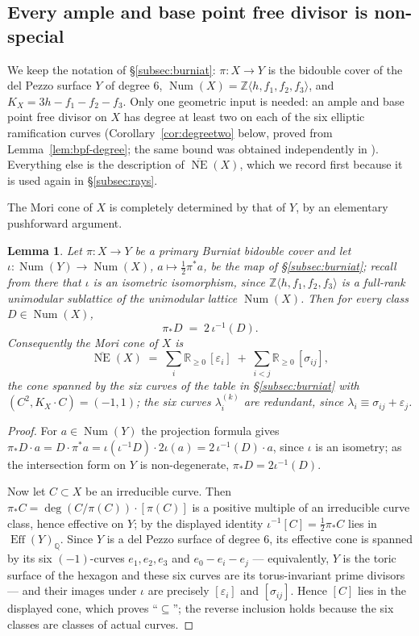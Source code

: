 \documentclass{amsart}
\newtheorem{lemma}[theorem]{Lemma}
\theoremstyle{definition}
\newcommand{\ZZ}{\mathbb{Z}}
\newcommand{\Num}{\operatorname{Num}}
\newcommand{\QQ}{\mathbb{Q}}
\newcommand{\RR}{\mathbb{R}}
\newcommand{\NE}{\overline{\operatorname{NE}}}
\newcommand{\Eff}{\operatorname{Eff}}
\begin{document}
\subsection{Every ample and base point free divisor is non-special}\label{subsec:nonspecial}
We keep the notation of \S\ref{subsec:burniat}: $\pi:X\to Y$ is the bidouble cover of the del Pezzo surface $Y$ of degree $6$, $\Num(X)=\ZZ\langle h,f_1,f_2,f_3\rangle$, and $K_X=3h-f_1-f_2-f_3$. Only one geometric input is needed: an ample and base point free divisor on $X$ has degree at least two on each of the six elliptic ramification curves (Corollary~\ref{cor:degreetwo} below, proved from Lemma~\ref{lem:bpf-degree}; the same bound was obtained independently in \cite[Prop.~5.4]{Cho26}). Everything else is the description of $\NE(X)$, which we record first because it is used again in \S\ref{subsec:rays}.

The Mori cone of $X$ is completely determined by that of $Y$, by an elementary pushforward argument.

\begin{lemma}\label{lem:mori}
Let $\pi:X\to Y$ be a primary Burniat bidouble cover and let $\iota:\Num(Y)\to\Num(X)$, $a\mapsto\tfrac12\pi^*a$, be the map of \S\ref{subsec:burniat}; recall from there that $\iota$ is an isometric \emph{isomorphism}, since $\ZZ\langle h,f_1,f_2,f_3\rangle$ is a full-rank unimodular sublattice of the unimodular lattice $\Num(X)$. Then for every class $D\in\Num(X)$,
\[
\pi_*D\;=\;2\,\iota^{-1}(D).
\]
Consequently the Mori cone of $X$ is
\[
\NE(X)\;=\;\sum_{i}\RR_{\ge0}\,[\varepsilon_i]\;+\;\sum_{i<j}\RR_{\ge0}\,[\sigma_{ij}] ,
\]
the cone spanned by the six curves of the table in \S\ref{subsec:burniat} with $(C^2,K_X\cdot C)=(-1,1)$; the six curves $\lambda_i^{(k)}$ are redundant, since $\lambda_i\equiv\sigma_{ij}+\varepsilon_j$.
\end{lemma}

\begin{proof}
For $a\in\Num(Y)$ the projection formula gives $\pi_*D\cdot a=D\cdot\pi^*a=\iota(\iota^{-1}D)\cdot 2\iota(a)=2\,\iota^{-1}(D)\cdot a$, since $\iota$ is an isometry; as the intersection form on $Y$ is non-degenerate, $\pi_*D=2\iota^{-1}(D)$.

Now let $C\subset X$ be an irreducible curve. Then $\pi_*C=\deg(C/\pi(C))\cdot[\pi(C)]$ is a positive multiple of an irreducible curve class, hence effective on $Y$; by the displayed identity $\iota^{-1}[C]=\tfrac12\pi_*C$ lies in $\Eff(Y)_\QQ$. Since $Y$ is a del Pezzo surface of degree $6$, its effective cone is spanned by its six $(-1)$-curves $e_1,e_2,e_3$ and $e_0-e_i-e_j$ --- equivalently, $Y$ is the toric surface of the hexagon and these six curves are its torus-invariant prime divisors --- and their images under $\iota$ are precisely $[\varepsilon_i]$ and $[\sigma_{ij}]$. Hence $[C]$ lies in the displayed cone, which proves ``$\subseteq$''; the reverse inclusion holds because the six classes are classes of actual curves.
\end{proof}
\end{document}
